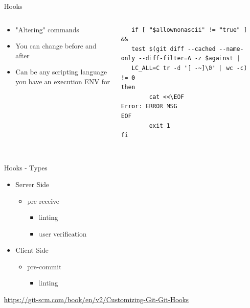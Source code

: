 \documentclass[table,svgnames,aspectratio=169]{beamer}
\begin{document}
\begin{frame}[fragile,label={sec:org07c060e}]{Hooks}
 \begin{columns}
\begin{column}{.4\columnwidth}
\begin{itemize}
\item "Altering" commands
\item You can change before and after
\item Can be any scripting language you have an execution ENV for
\end{itemize}
\end{column}

\begin{column}{.6\columnwidth}
\lstset{language=bash,label= ,caption= ,captionpos=b,numbers=none}
\begin{lstlisting}
   if [ "$allownonascii" != "true" ] &&
   test $(git diff --cached --name-only --diff-filter=A -z $against |
   LC_ALL=C tr -d '[ -~]\0' | wc -c) != 0
then
        cat <<\EOF
Error: ERROR MSG
EOF
        exit 1
fi


\end{lstlisting}
\end{column}
\end{columns}
\end{frame}

\begin{frame}[label={sec:orgd05de07}]{Hooks - Types}
\begin{itemize}
\item Server Side
\begin{itemize}
\item pre-receive 
\begin{itemize}
\item linting
\item user verification
\end{itemize}
\end{itemize}
\item Client Side 
\begin{itemize}
\item pre-commit
\begin{itemize}
\item linting
\end{itemize}
\end{itemize}
\end{itemize}

\url{https://git-scm.com/book/en/v2/Customizing-Git-Git-Hooks}
\end{frame}
\end{document}
